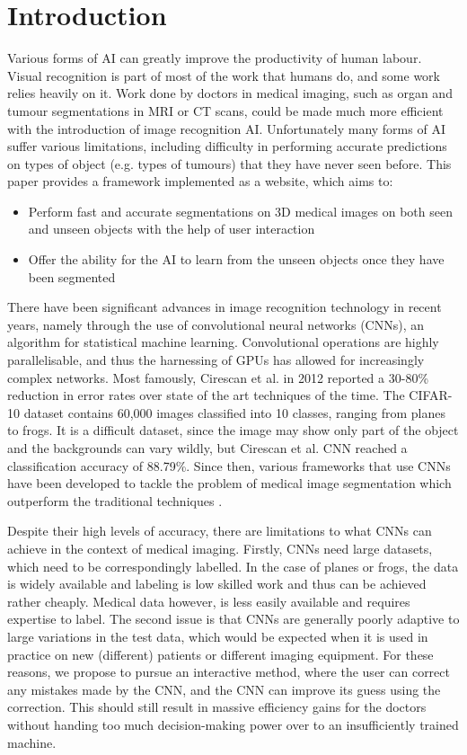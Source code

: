 \section{Introduction}

Various forms of AI can greatly improve the productivity of human labour. Visual recognition is part of most of the work that humans do, and some work relies heavily on it. Work done by doctors in medical imaging, such as organ and tumour segmentations in MRI or CT scans, could be made much more efficient with the introduction of image recognition AI. Unfortunately many forms of AI suffer various limitations, including difficulty in performing accurate predictions on types of object (e.g. types of tumours) that they have never seen before. This paper provides a framework implemented as a website, which aims to:
\begin{itemize}
\item Perform fast and accurate segmentations on 3D medical images on both seen and unseen objects with the help of user interaction
\item Offer the ability for the AI to learn from the unseen objects once they have been segmented
\end{itemize}

There have been significant advances in image recognition technology in recent years, namely through the use of convolutional neural networks (CNNs), an algorithm for statistical machine learning. Convolutional operations are highly parallelisable, and thus the harnessing of GPUs has allowed for increasingly complex networks. Most famously, Cirescan et al. \cite{cirescan} in 2012 reported a 30-80\% reduction in error rates over state of the art techniques of the time. The CIFAR-10 dataset contains 60,000 images classified into 10 classes, ranging from planes to frogs. It is a difficult dataset, since the image may show only part of the object and the backgrounds can vary wildly, but Cirescan et al. CNN reached a classification accuracy of 88.79\%. Since then, various frameworks that use CNNs have been developed to tackle the problem of medical image segmentation which outperform the traditional techniques \cite{fcn, uNet, UI-Net, deepIGeoS, BIFSeg}. 


Despite their high levels of accuracy, there are limitations to what CNNs can achieve in the context of medical imaging. Firstly, CNNs need large datasets, which need to be correspondingly labelled. In the case of planes or frogs, the data is widely available and labeling is low skilled work and thus can be achieved rather cheaply. Medical data however, is less easily available and requires expertise to label. The second issue is that CNNs are generally poorly adaptive to large variations in the test data, which would be expected when it is used in practice on new (different) patients or different imaging equipment. For these reasons, we propose to pursue an interactive method, where the user can correct any mistakes made by the CNN, and the CNN can improve its guess using the correction. This should still result in massive efficiency gains for the doctors without handing too much decision-making power over to an insufficiently trained machine. 

